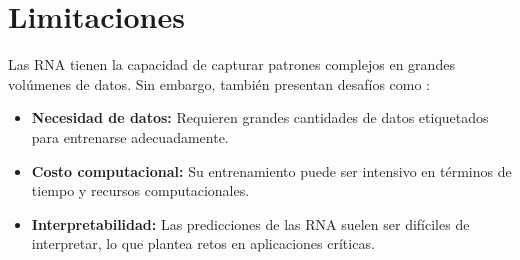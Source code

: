 \section{Limitaciones}
Las RNA tienen la capacidad de capturar patrones complejos en grandes volúmenes de datos. Sin embargo, también presentan desafíos como \cite{L13}:

\begin{itemize}
	\item \textbf{Necesidad de datos:} Requieren grandes cantidades de datos etiquetados para entrenarse adecuadamente.
	\item \textbf{Costo computacional:} Su entrenamiento puede ser intensivo en términos de tiempo y recursos computacionales.
	\item \textbf{Interpretabilidad:} Las predicciones de las RNA suelen ser difíciles de interpretar, lo que plantea retos en aplicaciones críticas.
\end{itemize} 

